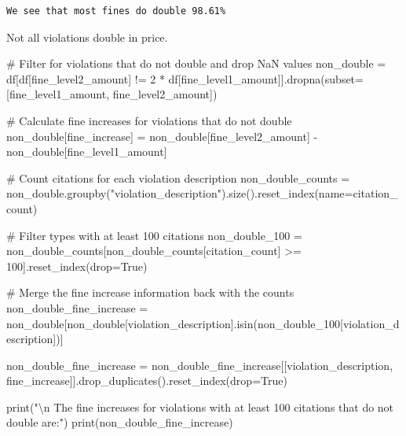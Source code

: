 \documentclass[
  letterpaper,
  DIV=11,
  numbers=noendperiod]{scrartcl}
\newenvironment{Shaded}{\begin{snugshade}}{\end{snugshade}}
\newcommand{\BuiltInTok}[1]{\textcolor[rgb]{0.00,0.23,0.31}{#1}}
\newcommand{\CharTok}[1]{\textcolor[rgb]{0.13,0.47,0.30}{#1}}
\newcommand{\CommentTok}[1]{\textcolor[rgb]{0.37,0.37,0.37}{#1}}
\newcommand{\DecValTok}[1]{\textcolor[rgb]{0.68,0.00,0.00}{#1}}
\newcommand{\NormalTok}[1]{\textcolor[rgb]{0.00,0.23,0.31}{#1}}
\newcommand{\OperatorTok}[1]{\textcolor[rgb]{0.37,0.37,0.37}{#1}}
\newcommand{\StringTok}[1]{\textcolor[rgb]{0.13,0.47,0.30}{#1}}
\newcommand{\VariableTok}[1]{\textcolor[rgb]{0.07,0.07,0.07}{#1}}
\begin{document}
\begin{verbatim}
We see that most fines do double 98.61%
\end{verbatim}

Not all violations double in price.

\begin{Shaded}
\begin{Highlighting}[]
\CommentTok{\# Filter for violations that do not double and drop NaN values}
\NormalTok{non\_double }\OperatorTok{=}\NormalTok{ df[df[}\StringTok{\textquotesingle{}fine\_level2\_amount\textquotesingle{}}\NormalTok{] }\OperatorTok{!=} \DecValTok{2} \OperatorTok{*}\NormalTok{ df[}\StringTok{\textquotesingle{}fine\_level1\_amount\textquotesingle{}}\NormalTok{]].dropna(subset}\OperatorTok{=}\NormalTok{[}\StringTok{\textquotesingle{}fine\_level1\_amount\textquotesingle{}}\NormalTok{, }\StringTok{\textquotesingle{}fine\_level2\_amount\textquotesingle{}}\NormalTok{])}

\CommentTok{\# Calculate fine increases for violations that do not double}
\NormalTok{non\_double[}\StringTok{\textquotesingle{}fine\_increase\textquotesingle{}}\NormalTok{] }\OperatorTok{=}\NormalTok{ non\_double[}\StringTok{\textquotesingle{}fine\_level2\_amount\textquotesingle{}}\NormalTok{] }\OperatorTok{{-}}\NormalTok{ non\_double[}\StringTok{\textquotesingle{}fine\_level1\_amount\textquotesingle{}}\NormalTok{]}

\CommentTok{\# Count citations for each violation description}
\NormalTok{non\_double\_counts }\OperatorTok{=}\NormalTok{ non\_double.groupby(}\StringTok{"violation\_description"}\NormalTok{).size().reset\_index(name}\OperatorTok{=}\StringTok{\textquotesingle{}citation\_count\textquotesingle{}}\NormalTok{)}

\CommentTok{\# Filter types with at least 100 citations}
\NormalTok{non\_double\_100 }\OperatorTok{=}\NormalTok{ non\_double\_counts[non\_double\_counts[}\StringTok{\textquotesingle{}citation\_count\textquotesingle{}}\NormalTok{] }\OperatorTok{\textgreater{}=} \DecValTok{100}\NormalTok{].reset\_index(drop}\OperatorTok{=}\VariableTok{True}\NormalTok{)}

\CommentTok{\# Merge the fine increase information back with the counts}
\NormalTok{non\_double\_fine\_increase }\OperatorTok{=}\NormalTok{ non\_double[non\_double[}\StringTok{\textquotesingle{}violation\_description\textquotesingle{}}\NormalTok{].isin(non\_double\_100[}\StringTok{\textquotesingle{}violation\_description\textquotesingle{}}\NormalTok{])]}


\NormalTok{non\_double\_fine\_increase }\OperatorTok{=}\NormalTok{ non\_double\_fine\_increase[[}\StringTok{\textquotesingle{}violation\_description\textquotesingle{}}\NormalTok{, }\StringTok{\textquotesingle{}fine\_increase\textquotesingle{}}\NormalTok{]].drop\_duplicates().reset\_index(drop}\OperatorTok{=}\VariableTok{True}\NormalTok{)}

\BuiltInTok{print}\NormalTok{(}\StringTok{"}\CharTok{\textbackslash{}n}\StringTok{ The fine increases for violations with at least 100 citations that do not double are:"}\NormalTok{)}
\BuiltInTok{print}\NormalTok{(non\_double\_fine\_increase)}
\end{Highlighting}
\end{Shaded}
\end{document}
